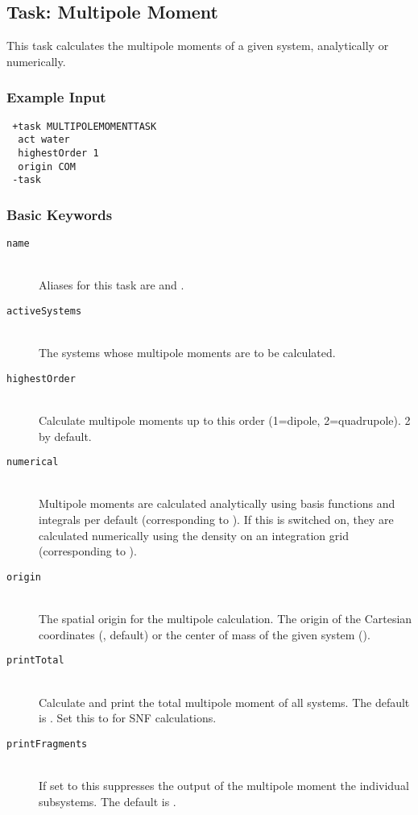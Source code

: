 \subsection{Task: Multipole Moment}
This task calculates the multipole moments of a given system, analytically or numerically.
\subsubsection{Example Input}
\begin{lstlisting}
 +task MULTIPOLEMOMENTTASK
  act water
  highestOrder 1
  origin COM
 -task
\end{lstlisting}

\subsubsection{Basic Keywords}
\begin{description}
\item [\texttt{name}]\hfill \\
  Aliases for this task are  and .
\item [\texttt{activeSystems}]\hfill \\
  The systems whose multipole moments are to be calculated.
\item [\texttt{highestOrder}]\hfill \\
Calculate multipole moments up to this order (1=dipole, 2=quadrupole). 2 by default.
\item [\texttt{numerical}]\hfill \\
Multipole moments are calculated analytically using basis functions
and integrals per default (corresponding to ). If this is switched on,
they are calculated numerically using the density on an integration grid (corresponding to ).
\item [\texttt{origin}]\hfill \\
The spatial origin for the multipole calculation.
The origin of the Cartesian coordinates (, default) or the center
of mass of the given system ().
\item [\texttt{printTotal}]\hfill \\
Calculate and print the total multipole moment of all systems. The default is .
Set this to  for \textsc{SNF}\cite{SNF2002} calculations.
\item [\texttt{printFragments}]\hfill \\
If set to  this suppresses the output of the multipole moment the individual subsystems.
The default is .
\end{description}
